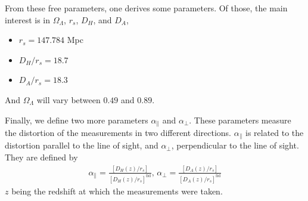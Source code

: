 From these free parameters, one derives some parameters. Of those, the main interest is in $\Omega_\Lambda$, $r_s$, $D_H$, and $D_A$, 
\begin{itemize}
	\item $r_s = 147.784 $ Mpc
	\item $D_H/r_s  = 18.7$
	\item $D_A/r_s  = 18.3$
\end{itemize}
And $\Omega_\Lambda$ will vary between $0.49$ and $0.89$.

Finally, we define two more parameters $\alpha_\parallel$ and $\alpha_\perp$. These parameters measure the distortion of the measurements in two different directions. $\alpha_\parallel$ is related to the distortion parallel to the line of sight, and  $\alpha_\perp$, perpendicular to the line of sight. They are defined by 
\begin{align}
	\alpha_\parallel = \frac{\left[ D_H(z) /r_s \right] }{\left[ D_H(z)/r_s \right]^{\text{fid}} }, \, \alpha_\perp = \frac{\left[ D_A(z) /r_s \right] }{\left[ D_A(z)/r_s \right]^{\text{fid}} }
	\label{eq:alphas-def}
\end{align}
$z$ being the redshift at which the measurements were taken.
